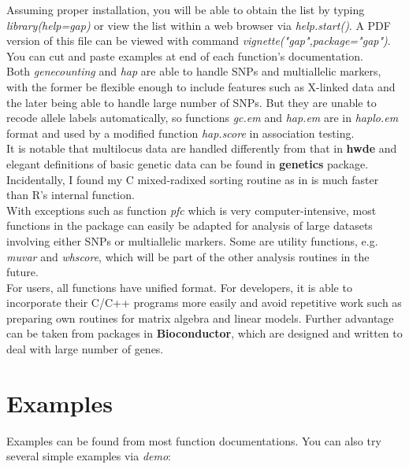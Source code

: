 \documentclass[11pt,a4paper]{article}
\begin{document}
Assuming proper installation, you will be able to obtain the list by typing
\textit{library(help=gap)} or view the list within a web browser via 
\textit{help.start()}. A PDF version of this file can be viewed with command
\textit{vignette("gap",package="gap")}.\\

You can cut and paste examples at end of each function's documentation.\\

Both \textit{genecounting} and \textit{hap} are able to handle SNPs and multiallelic
markers, with the former be flexible enough to include features such as X-linked data
and the later being able to handle large number of SNPs. But they are unable to
recode allele labels automatically, so functions \textit{gc.em} and \textit{hap.em}
are in \textit{haplo.em} format and used by a modified function \textit{hap.score} in
association testing.\\

It is notable that multilocus data are handled differently from that in {\bf hwde} and
elegant definitions of basic genetic data can be found in {\bf genetics} package.\\

Incidentally, I found my C mixed-radixed sorting routine as in \cite{zhao03} is much
faster than R's internal function.\\

With exceptions such as function \textit{pfc} which is very computer-intensive, most
functions in the package can easily be adapted for analysis of large datasets involving
either SNPs or multiallelic markers. Some are utility functions, e.g. \textit{muvar}
and \textit{whscore}, which will be part of the other analysis routines in the future.\\

For users, all functions have unified format. For developers, it is able to incorporate
their C/C++ programs more easily and avoid repetitive work such as preparing own routines
for matrix algebra and linear models. Further advantage can be taken from packages in
{\bf Bioconductor}, which are designed and written to deal with large number of genes.


\section{Examples}

Examples can be found from most function documentations. You can also try several simple
examples via \textit{demo}:
\end{document}
